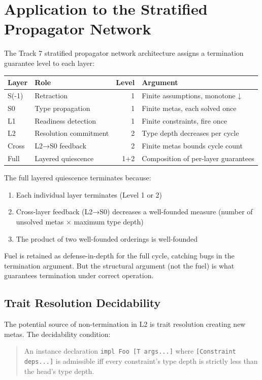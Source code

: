 \documentclass[11pt]{article}
\begin{document}
\section{Application to the Stratified Propagator Network}
\label{sec:org8713e36}

The Track 7 stratified propagator network architecture assigns a
termination guarantee level to each layer:

\begin{center}
\begin{tabular}{llrl}
Layer & Role & Level & Argument\\
\hline
S(-1) & Retraction & 1 & Finite assumptions, monotone ↓\\
S0 & Type propagation & 1 & Finite metas, each solved once\\
L1 & Readiness detection & 1 & Finite constraints, fire once\\
L2 & Resolution commitment & 2 & Type depth decreases per cycle\\
Cross & L2→S0 feedback & 2 & Finite metas bounds cycle count\\
Full & Layered quiescence & 1+2 & Composition of per-layer guarantees\\
\end{tabular}
\end{center}

The full layered quiescence terminates because:
\begin{enumerate}
\item Each individual layer terminates (Level 1 or 2)
\item Cross-layer feedback (L2→S0) decreases a well-founded measure
(number of unsolved metas × maximum type depth)
\item The product of two well-founded orderings is well-founded
\end{enumerate}

Fuel is retained as defense-in-depth for the full cycle, catching
bugs in the termination argument. But the structural argument (not
the fuel) is what guarantees termination under correct operation.
\subsection{Trait Resolution Decidability}
\label{sec:org52b0724}

The potential source of non-termination in L2 is trait resolution
creating new metas. The decidability condition:

\begin{quote}
An instance declaration \texttt{impl Foo [T args...]} where \texttt{[Constraint deps...]}
is admissible iff every constraint's type depth is strictly less than
the head's type depth.
\end{quote}
\end{document}
